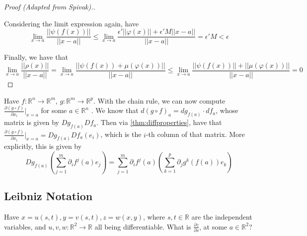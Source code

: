 \begin{proof}[Proof (Adapted from Spivak).]
\begin{itemize}
        Considering the limit expression again, have
        \[
        \lim_{ x \to a } \frac{||\psi(f(x))||}{||x-a||} \leq \lim_{ x \to a } \frac{\epsilon' ||\varphi(x)|| + \epsilon' M||x-a||}{||x-a||} = \epsilon' M < \epsilon 
        \]
    \end{itemize}
    Finally, we have that
    \[
    \lim_{ x \to a } \frac{||\rho(x)||}{||x-a||} = \lim_{ x \to a } \frac{||\psi(f(x)) + \mu(\varphi(x))||}{||x-a||} \leq \lim_{ x
    \to a } \frac{||\psi(f(x))|| + ||\mu(\varphi(x))||}{||x-a||} = 0
    \]
\end{proof}

\noindent Have $f : \mathbb{R}^n \to \mathbb{R}^m$, $g : \mathbb{R}^m \to \mathbb{R}^p$. With the chain rule, we can now compute $\frac{\partial (g \circ f)}{\partial x_i}\big|_{x=a}$ for some $a \in \mathbb{R}^n$ . We know that $d(g \circ f)_a = dg_{f(a)} \cdot df_a$, whose matrix is given by $Dg_{f(a)}Df_a$. Then via \ref{thm:diffproperties}, have that $\frac{\partial(g \circ f)}{\partial x_i}\big|_{x=a}= Dg_{f(a)}Df_a(e_i)$, which is the $i$-th column of that matrix. More explicitly, this is given by
\[
Dg_{f(a)} \left(\sum_{j=1}^{m} \partial_i f^j(a) e_j \right) = \sum_{j=1}^{m} \partial_i f^j(a) \left(\sum_{k=1}^{p} \partial_jg^k(f(a)) e_k \right)
\]

\subsection{Leibniz Notation}

\begin{example}
    Have $x = u(s, t), y = v(s, t), z = w(x, y)$, where $s, t \in \mathbb{R}$ are the independent variables, and $u, v, w : \mathbb{R}^2 \to \mathbb{R}$ all being differentiable. What is $\frac{\partial z}{\partial s}$, at some $a \in \mathbb{R}^2$?
\end{example}

